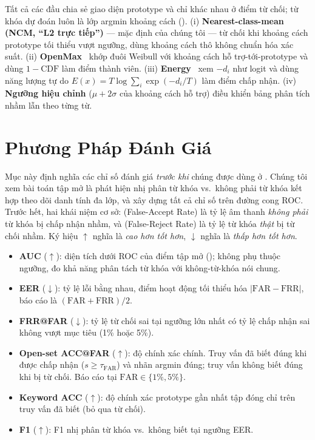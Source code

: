 \documentclass[12pt,a4paper]{report}
\newcommand{\far}{\text{FAR}}
\newcommand{\frr}{\text{FRR}}
\begin{document}
Tất cả các đầu chia sẻ giao diện prototype và chỉ khác nhau ở điểm từ chối; từ
khóa dự đoán luôn là lớp argmin khoảng cách ().
(i) \textbf{Nearest-class-mean (NCM, ``L2 trực tiếp'')} --- mặc định của chúng
tôi --- từ chối khi khoảng cách prototype tối thiểu vượt ngưỡng, dùng khoảng cách
thô không chuẩn hóa xác suất.
(ii) \textbf{OpenMax}~\cite{bendale2016openmax} khớp đuôi Weibull với khoảng cách
hỗ trợ-tới-prototype và dùng $1-\text{CDF}$ làm điểm thành viên.
(iii) \textbf{Energy}~\cite{liu2020energy} xem $-d_i$ như logit và dùng năng
lượng tự do $E(x)=T\log\sum_i\exp(-d_i/T)$ làm điểm chấp nhận.
(iv) \textbf{Ngưỡng hiệu chỉnh} ($\mu+2\sigma$ của khoảng cách hỗ trợ) điều
khiển bảng phân tích nhầm lẫn theo từng từ.

\section{Phương Pháp Đánh Giá}\label{sec:eval}

Mục này định nghĩa các chỉ số đánh giá \emph{trước khi} chúng được dùng ở
. Chúng tôi xem bài toán tập mở là phát hiện nhị phân từ khóa
vs.\ không phải từ khóa kết hợp theo dõi danh tính đa lớp, và xây dựng tất cả chỉ
số trên đường cong ROC. Trước hết, hai khái niệm cơ sở: \far{} (False-Accept
Rate) là tỷ lệ âm thanh \emph{không phải} từ khóa bị chấp nhận nhầm, và \frr{}
(False-Reject Rate) là tỷ lệ từ khóa \emph{thật} bị từ chối nhầm. Ký hiệu
$\uparrow$ nghĩa là \emph{cao hơn tốt hơn}, $\downarrow$ nghĩa là \emph{thấp hơn
tốt hơn}.
\begin{itemize}[leftmargin=1.3em,itemsep=1pt]
\item \textbf{AUC} ($\uparrow$): diện tích dưới ROC của điểm tập mở
(); không phụ thuộc ngưỡng, đo khả năng phân tách từ khóa với
không-từ-khóa nói chung.
\item \textbf{EER} ($\downarrow$): tỷ lệ lỗi bằng nhau, điểm hoạt động tối thiểu
hóa $|\far-\frr|$, báo cáo là $(\far+\frr)/2$.
\item \textbf{FRR@FAR} ($\downarrow$): tỷ lệ từ chối sai tại ngưỡng lớn nhất có tỷ
lệ chấp nhận sai không vượt mục tiêu (1\% hoặc 5\%).
\item \textbf{Open-set ACC@FAR} ($\uparrow$): độ chính xác chính. Truy vấn đã biết
đúng khi được chấp nhận ($s\ge\tau_{\far}$) và nhãn argmin đúng; truy vấn không
biết đúng khi bị từ chối. Báo cáo tại $\far\in\{1\%, 5\%\}$.
\item \textbf{Keyword ACC} ($\uparrow$): độ chính xác prototype gần nhất tập đóng
chỉ trên truy vấn đã biết (bỏ qua từ chối).
\item \textbf{F1} ($\uparrow$): F1 nhị phân từ khóa vs.\ không biết tại ngưỡng EER.
\end{itemize}
\end{document}
